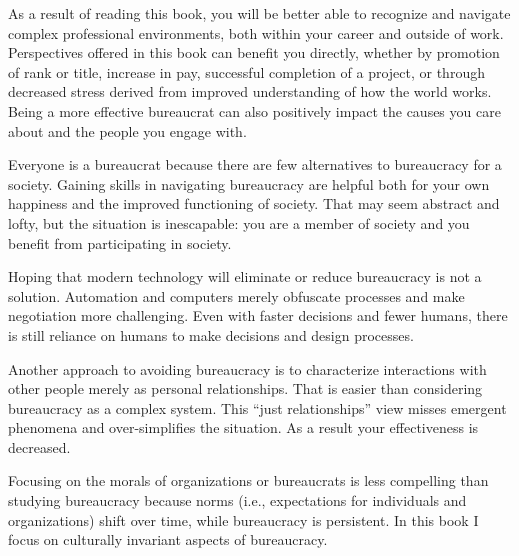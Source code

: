 As a result of reading this book, you will be better able to recognize and navigate complex professional environments, both within your career and outside of work. Perspectives offered in this book can benefit you directly, whether by promotion of rank or title, increase in pay, successful completion of a project, or through decreased stress derived from improved understanding of how the world works. Being a more effective bureaucrat can also positively impact the causes you care about and the people you engage with.





Everyone is a bureaucrat because there are few alternatives to bureaucracy for a society. Gaining skills in navigating bureaucracy are helpful both for your own happiness and the improved functioning of society. That may seem abstract and lofty, but the situation is inescapable: you are a member of society and you benefit from participating in society. 

Hoping that modern technology will eliminate or reduce bureaucracy is not a solution. Automation and computers merely obfuscate processes and make negotiation more challenging. Even with faster decisions and fewer humans, there is still reliance on humans to make decisions and design processes.

Another approach to avoiding bureaucracy is to characterize interactions with other people merely as personal relationships. That is easier than considering bureaucracy as a complex system.
This ``just relationships'' view misses emergent phenomena and over-simplifies the situation. As a result your effectiveness is decreased.






Focusing on the morals of organizations or bureaucrats is less compelling than studying bureaucracy because norms (i.e., expectations for individuals and organizations) shift over time, while bureaucracy is persistent. 
In this book I focus on culturally invariant aspects of bureaucracy. 

